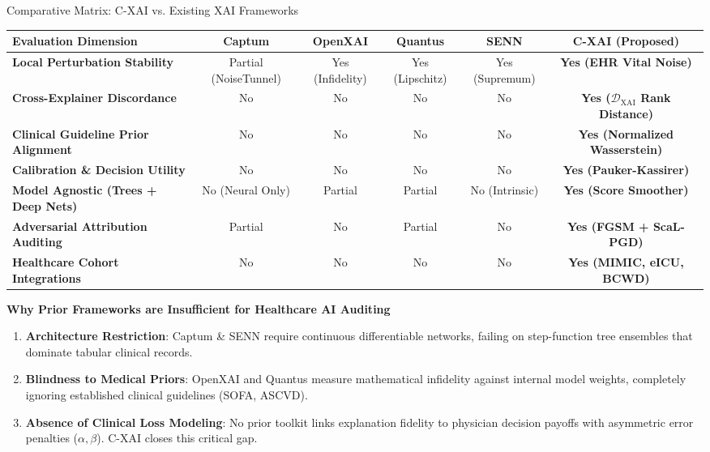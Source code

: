 \documentclass[aspectratio=169,10pt]{beamer}
\begin{document}
\begin{frame}{Comparative Matrix: C-XAI vs. Existing XAI Frameworks}
  \vspace{-0.15cm}
  \begin{table}[h]
    \centering
    \tiny
    \begin{tabularx}{\textwidth}{lccccc}
      \toprule
      \textbf{Evaluation Dimension} & \textbf{Captum} & \textbf{OpenXAI} & \textbf{Quantus} & \textbf{SENN} & \textbf{C-XAI (Proposed)} \\
      \midrule
      \textbf{Local Perturbation Stability} & Partial (NoiseTunnel) & Yes (Infidelity) & Yes (Lipschitz) & Yes (Supremum) & \textbf{Yes (EHR Vital Noise)} \\
      \textbf{Cross-Explainer Discordance} & No & No & No & No & \textbf{Yes ($\mathcal{D}_{\text{XAI}}$ Rank Distance)} \\
      \textbf{Clinical Guideline Prior Alignment} & No & No & No & No & \textbf{Yes (Normalized Wasserstein)} \\
      \textbf{Calibration \& Decision Utility} & No & No & No & No & \textbf{Yes (Pauker-Kassirer)} \\
      \textbf{Model Agnostic (Trees + Deep Nets)} & No (Neural Only) & Partial & Partial & No (Intrinsic) & \textbf{Yes (Score Smoother)} \\
      \textbf{Adversarial Attribution Auditing} & Partial & No & Partial & No & \textbf{Yes (FGSM + ScaL-PGD)} \\
      \textbf{Healthcare Cohort Integrations} & No & No & No & No & \textbf{Yes (MIMIC, eICU, BCWD)} \\
      \bottomrule
    \end{tabularx}
  \end{table}
  \vspace{-0.15cm}
  \begin{block}{\textbf{Why Prior Frameworks are Insufficient for Healthcare AI Auditing}}
    \scriptsize
    \begin{enumerate}\setlength\itemsep{1.5pt}
      \item \textbf{Architecture Restriction}: Captum \& SENN require continuous differentiable networks, failing on step-function tree ensembles that dominate tabular clinical records.
      \item \textbf{Blindness to Medical Priors}: OpenXAI and Quantus measure mathematical infidelity against internal model weights, completely ignoring established clinical guidelines (SOFA, ASCVD).
      \item \textbf{Absence of Clinical Loss Modeling}: No prior toolkit links explanation fidelity to physician decision payoffs with asymmetric error penalties ($\alpha, \beta$). C-XAI closes this critical gap.
    \end{enumerate}
  \end{block}
\end{frame}
\end{document}
